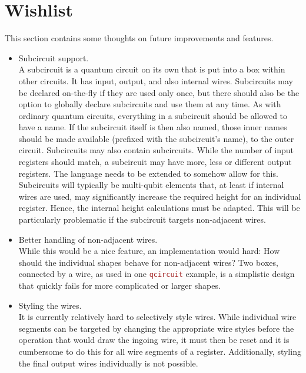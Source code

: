 \documentclass{scrartcl}
\def\pkg#1{\textcolor{brown}{\texttt{#1}}}
\begin{document}
   \section{Wishlist}
      This section contains some thoughts on future improvements and features.
      \begin{itemize}
         \item Subcircuit support. \\
            A subcircuit is a quantum circuit on its own that is put into a box within other circuits.
            It has input, output, and also internal wires.
            Subcircuits may be declared on\hyp the\hyp fly if they are used only once, but there should also be the option to globally declare subcircuits and use them at any time.
            As with ordinary quantum circuits, everything in a subcircuit should be allowed to have a name.
            If the subcircuit itself is then also named, those inner names should be made available (prefixed with the subcircuit's name), to the outer circuit.
            Subcircuits may also contain subcircuits.
            While the number of input registers should match, a subcircuit may have more, less or different output registers.
            The language needs to be extended to somehow allow for this.
            Subcircuits will typically be multi\hyp qubit elements that, at least if internal wires are used, may significantly increase the required height for an individual register.
            Hence, the internal height calculations must be adapted.
            This will be particularly problematic if the subcircuit targets non\hyp adjacent wires.
         \item Better handling of non\hyp adjacent wires. \\
            While this would be a nice feature, an implementation would hard: How should the individual shapes behave for non\hyp adjacent wires?
            Two boxes, connected by a wire, as used in one \pkg{qcircuit} example, is a simplistic design that quickly fails for more complicated or larger shapes.
         \item Styling the wires. \\
            It is currently relatively hard to selectively style wires.
            While individual wire segments can be targeted by changing the appropriate wire styles before the operation that would draw the ingoing wire, it must then be reset and it is cumbersome to do this for all wire segments of a register.
            Additionally, styling the final output wires individually is not possible.

\end{itemize}
\end{document}
